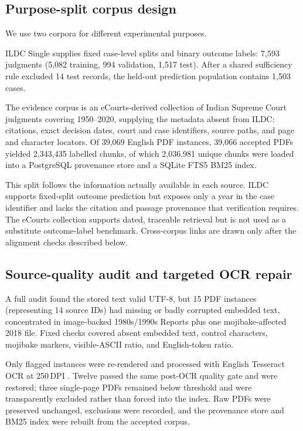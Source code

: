 \documentclass[conference]{IEEEtran}
\begin{document}
\subsection{Purpose-split corpus design}

We use two corpora for different experimental purposes.

ILDC Single supplies fixed case-level splits and binary outcome labels: 7{,}593 judgments (5{,}082 training, 994 validation,
1{,}517 test). After a shared sufficiency rule excluded 14 test records,
the held-out prediction population contains 1{,}503 cases.

The evidence corpus is an eCourts-derived collection of Indian Supreme Court
judgments covering 1950--2020, supplying the metadata absent
from ILDC: citations, exact decision dates, court and case identifiers, source
paths, and page and character locators. Of 39{,}069 English
PDF instances, 39{,}066 accepted PDFs yielded
2{,}343{,}435 labelled chunks, of which 2{,}036{,}981 unique chunks were loaded
into a PostgreSQL provenance store and a SQLite FTS5 BM25 index.

This split follows the information actually available in each source. ILDC
supports fixed-split outcome prediction but exposes only a year in the case
identifier and lacks the citation and passage provenance that verification
requires. The eCourts collection supports dated, traceable retrieval but is not
used as a substitute outcome-label benchmark. Cross-corpus links are drawn only
after the alignment checks described below.

\subsection{Source-quality audit and targeted OCR repair}

A full audit found the stored text valid UTF-8, but 15 PDF instances
(representing 14 source IDs) had missing or badly corrupted embedded text,
concentrated in image-backed 1980s/1990s Reports plus one mojibake-affected
2018 file. Fixed checks covered absent
embedded text, control characters, mojibake markers, visible-ASCII ratio, and
English-token ratio.

Only flagged instances were re-rendered and processed with English Tesseract OCR
at 250\,DPI \cite{smith2007}. Twelve passed the same post-OCR quality gate and
were restored; three single-page PDFs remained below threshold and were
transparently excluded rather than forced into the index. Raw PDFs were
preserved unchanged, exclusions were recorded, and the provenance store and BM25
index were rebuilt from the accepted corpus.
\end{document}

